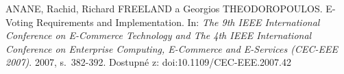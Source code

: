 \begin{thebibliography}{1}

ANANE, Rachid, Richard FREELAND a Georgios THEODOROPOULOS. E-Voting Requirements and Implementation. In: \textit{The 9th IEEE International Conference on E-Commerce Technology and The 4th IEEE International Conference on Enterprise Computing, E-Commerce and E-Services (CEC-EEE 2007)}. 2007, s.~382-392. Dostupné z: doi:10.1109/CEC-EEE.2007.42

\end{thebibliography}